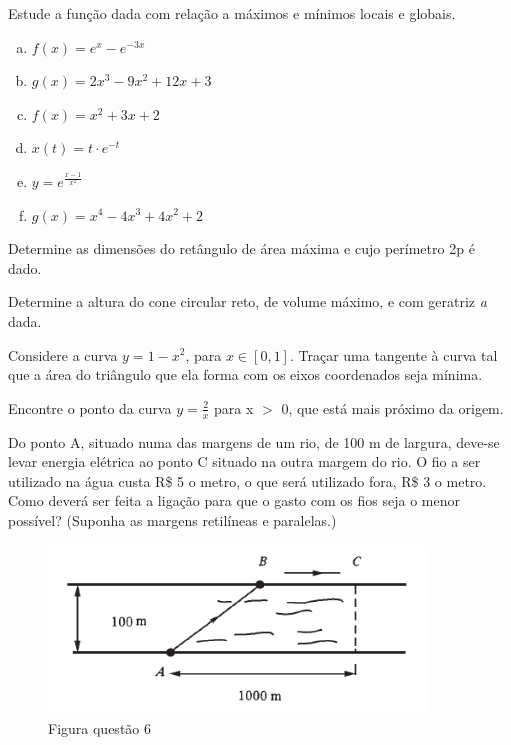 \documentclass[12pt]{exam}
\begin{document}
\begin{questions}
    \question Estude a função dada com relação a máximos e mínimos locais e globais.
    \begin{multicols}{1}
        \begin{enumerate}[(a)]
            \item
            $\displaystyle f(x) = e^x - e^{-3x} $
            \item 
            $\displaystyle g(x) = 2x^3 - 9x^2 + 12x + 3 $
            \item 
            $\displaystyle f(x) = x^2 + 3x + 2 $
            \item 
            $\displaystyle x(t) = t\cdot e^{-t}$
            \item 
            $\displaystyle y = e^{\displaystyle\frac{x-1}{x^2}}$
            \item 
            $\displaystyle g(x) = x^4 - 4x^3 + 4x^2 + 2 $
        \end{enumerate}
    \end{multicols}

    \question Determine as dimensões do retângulo de área máxima e cujo perímetro 2p é dado.

    \question Determine a altura do cone circular reto, de volume máximo, e com geratriz \textit{a} dada.

    
    \question Considere a curva $\displaystyle y = 1 - x^2 $,  para $x \in [0,1] $. Traçar uma tangente à
curva tal que a área do triângulo que ela forma com os eixos
coordenados seja mínima.

    
    \question Encontre o ponto da curva $\displaystyle y = \frac{2}{x} $ para x $>$ 0, que está mais próximo da origem.
    
    
    \question Do ponto A, situado numa das margens de um rio, de 100 m de largura, deve-se levar energia elétrica ao ponto C situado na outra margem do rio. O fio a ser utilizado na água custa R\$ 5 o metro, o que será utilizado fora, R\$ 3 o metro. Como deverá ser feita a ligação para que o gasto com os fios 
 seja o menor possível? (Suponha as margens retilíneas e paralelas.)

\begin{figure}[h]
    \centering
    \includegraphics[width=10cm]{Screenshot 2024-01-30 162142.png}
    \caption{Figura questão 6}
    \label{fig:enter-label}
\end{figure}


\end{questions}
\end{document}
